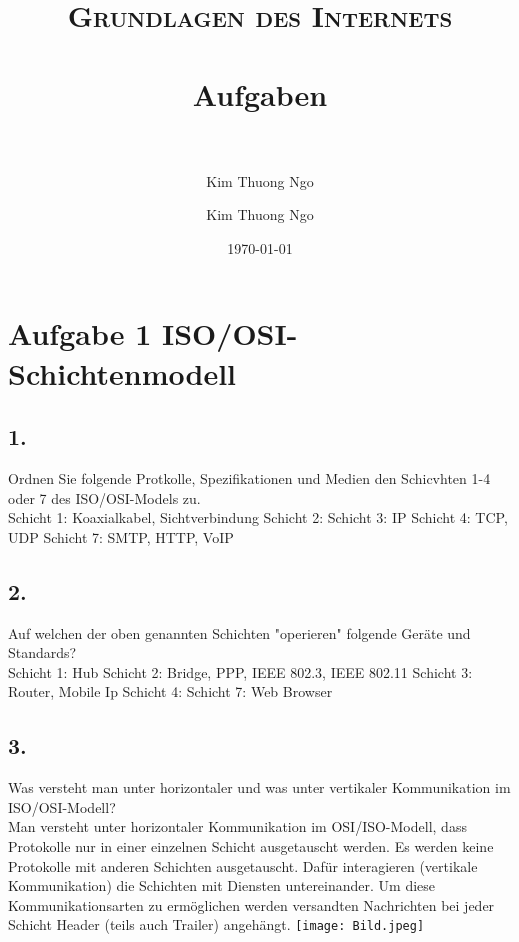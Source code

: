 \documentclass[paper=a4, fontsize=11pt]{scrartcl}
\author{Kim Thuong Ngo}
\title{	
\normalfont \normalsize 
\textsc{Grundlagen des Internets} \\ [25pt] 
\horrule{0.5pt} \\[0.4cm] 
\huge Aufgaben \\ 
\horrule{2pt} \\[0.5cm] 
}
\author{Kim Thuong Ngo}
\date{\normalsize\today}
\numberwithin{equation}{section}
\numberwithin{figure}{section}
\numberwithin{table}{section}
\begin{document}
\maketitle 

\newpage

\tableofcontents

\newpage


\section{Aufgabe 1 ISO/OSI-Schichtenmodell}
\subsection{1.}
Ordnen Sie folgende Protkolle, Spezifikationen und Medien den Schicvhten 1-4 oder 7 des ISO/OSI-Models zu. \\
Schicht 1: Koaxialkabel, Sichtverbindung\newline
Schicht 2:\newline
Schicht 3: IP\newline
Schicht 4: TCP, UDP\newline
Schicht 7: SMTP, HTTP, VoIP\newline

\subsection{2.}
Auf welchen der oben genannten Schichten "operieren" folgende Geräte und Standards? \\
Schicht 1: Hub\newline
Schicht 2: Bridge, PPP, IEEE 802.3, IEEE 802.11\newline
Schicht 3: Router, Mobile Ip\newline
Schicht 4: \newline
Schicht 7: Web Browser\newline

\subsection{3.}
Was versteht man unter horizontaler und was unter vertikaler Kommunikation im ISO/OSI-Modell? \\
Man versteht unter horizontaler Kommunikation im OSI/ISO-Modell, dass Protokolle nur in einer einzelnen Schicht ausgetauscht werden. Es werden keine Protokolle mit anderen Schichten ausgetauscht. Dafür interagieren (vertikale Kommunikation) die Schichten mit Diensten untereinander. Um diese Kommunikationsarten zu ermöglichen werden versandten Nachrichten bei jeder Schicht Header (teils auch Trailer) angehängt.\newline
\texttt{[image: Bild.jpeg]}
\end{document}
